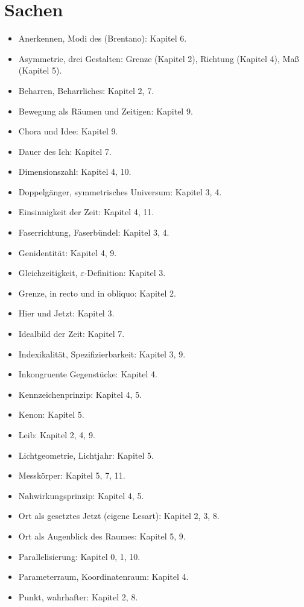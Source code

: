 \chapter{Sachen}

\begin{itemize}
\item Anerkennen, Modi des (Brentano): Kapitel 6.
\item Asymmetrie, drei Gestalten: Grenze (Kapitel 2), Richtung (Kapitel 4), Maß (Kapitel 5).
\item Beharren, Beharrliches: Kapitel 2, 7.
\item Bewegung als Räumen und Zeitigen: Kapitel 9.
\item Chora und Idee: Kapitel 9.
\item Dauer des Ich: Kapitel 7.
\item Dimensionszahl: Kapitel 4, 10.
\item Doppelgänger, symmetrisches Universum: Kapitel 3, 4.
\item Einsinnigkeit der Zeit: Kapitel 4, 11.
\item Faserrichtung, Faserbündel: Kapitel 3, 4.
\item Genidentität: Kapitel 4, 9.
\item Gleichzeitigkeit, $\varepsilon$-Definition: Kapitel 3.
\item Grenze, in recto und in obliquo: Kapitel 2.
\item Hier und Jetzt: Kapitel 3.
\item Idealbild der Zeit: Kapitel 7.
\item Indexikalität, Spezifizierbarkeit: Kapitel 3, 9.
\item Inkongruente Gegenstücke: Kapitel 4.
\item Kennzeichenprinzip: Kapitel 4, 5.
\item Kenon: Kapitel 5.
\item Leib: Kapitel 2, 4, 9.
\item Lichtgeometrie, Lichtjahr: Kapitel 5.
\item Messkörper: Kapitel 5, 7, 11.
\item Nahwirkungsprinzip: Kapitel 4, 5.
\item Ort als gesetztes Jetzt (eigene Lesart): Kapitel 2, 3, 8.
\item Ort als Augenblick des Raumes: Kapitel 5, 9.
\item Parallelisierung: Kapitel 0, 1, 10.
\item Parameterraum, Koordinatenraum: Kapitel 4.
\item Punkt, wahrhafter: Kapitel 2, 8.

\end{itemize}
